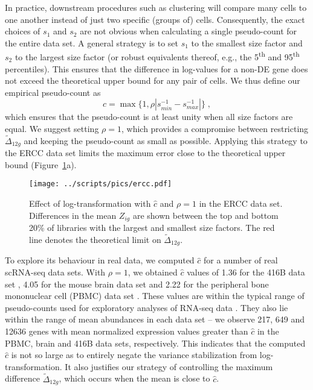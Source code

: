 \documentclass[10pt,letterpaper]{article}
\begin{document}
In practice, downstream procedures such as clustering will compare many cells to one another instead of just two specific (groups of) cells.
Consequently, the exact choices of $s_1$ and $s_2$ are not obvious when calculating a single pseudo-count for the entire data set.
A general strategy is to set $s_1$ to the smallest size factor and $s_2$ to the largest size factor
(or robust equivalents thereof, e.g., the 5\textsuperscript{th} and 95\textsuperscript{th} percentiles).
This ensures that the difference in log-values for a non-DE gene does not exceed the theoretical upper bound for any pair of cells.
We thus define our empirical pseudo-count as
\[
\hat c = \max\{1, \rho |s_{min}^{-1} - s_{max}^{-1}|\} \;,
\]
which ensures that the pseudo-count is at least unity when all size factors are equal.
We suggest setting $\rho=1$, which provides a compromise between restricting $\tilde\Delta_{12g}$ and keeping the pseudo-count as small as possible.
Applying this strategy to the ERCC data set limits the maximum error close to the theoretical upper bound (Figure~\ref{fig:bigreal}a).

\begin{figure}
\begin{center}
    \texttt{[image: ../scripts/pics/ercc.pdf]}
\end{center}
\caption{Effect of log-transformation with $\hat c$ and $\rho =1$ in the ERCC data set.
Differences in the mean $Z_{ig}$ are shown between the top and bottom 20\% of libraries with the largest and smallest size factors.
The red line denotes the theoretical limit on $\tilde \Delta_{12g}$.}
\label{fig:bigreal}
\end{figure}

To explore its behaviour in real data, we computed $\hat c$ for a number of real scRNA-seq data sets. 
With $\rho=1$, we obtained $\hat c$ values of 1.36 for the 416B data set \cite{lun2017assessing}, 4.05 for the mouse brain data set \cite{zeisel2015brain} and 2.22 for the peripheral bone mononuclear cell (PBMC) data set \cite{zheng2017massively}.
These values are within the typical range of pseudo-counts used for exploratory analyses of RNA-seq data \cite{chen2016reads}.
They also lie within the range of mean abundances in each data set -- we observe 217, 649 and 12636 genes with mean normalized expression values greater than $\hat c$ in the PBMC, brain and 416B data sets, respectively.
This indicates that the computed $\hat c$ is not so large as to entirely negate the variance stabilization from log-transformation.
It also justifies our strategy of controlling the maximum difference $\tilde \Delta_{12g}$, which occurs when the mean is close to $\hat c$.
\end{document}
